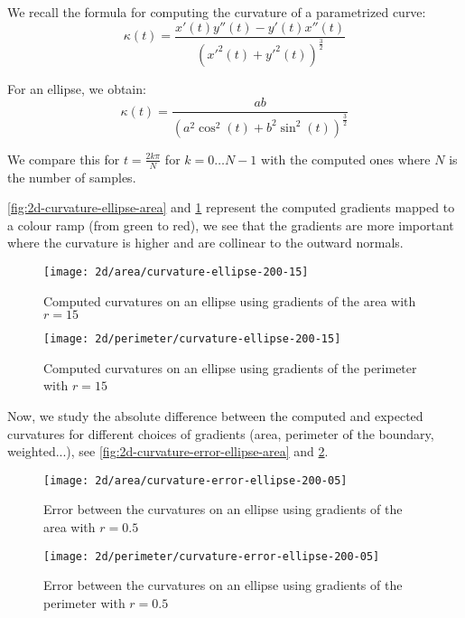 We recall the formula for computing the curvature of a parametrized curve:
$$ \kappa(t) = \frac{x'(t) y''(t) - y'(t) x''(t)}{(x'^2(t) +
    y'^2(t))^{\frac{3}{2}} } $$

For an ellipse, we obtain:
$$ \kappa(t) = \frac{ab}{(a^2 \cos^2(t) + b^2 \sin^2(t))^{\frac{3}{2}} } $$

We compare this for $ t = \frac{2 k \pi}{N} $ for $ k = 0 \ldots N - 1 $ with
the computed ones where $ N $ is the number of samples.

\ref{fig:2d-curvature-ellipse-area} and \ref{fig:2d-curvature-ellipse-perimeter}
represent the computed gradients mapped to a colour ramp (from green to red), we
see that the gradients are more important where the curvature is higher and are
collinear to the outward normals.

\begin{figure}[h]
    \centering

    \texttt{[image: 2d/area/curvature-ellipse-200-15]}
    \caption{Computed curvatures on an ellipse using gradients of the area with $ r = 15 $}
    \label{fig:2d-curvature-ellipse-area}

    \texttt{[image: 2d/perimeter/curvature-ellipse-200-15]}
    \caption{Computed curvatures on an ellipse using gradients of the perimeter with $ r = 15 $}
    \label{fig:2d-curvature-ellipse-perimeter}
\end{figure}


Now, we study the absolute difference between the computed and expected
curvatures for different choices of gradients (area, perimeter of the boundary,
weighted...), see \ref{fig:2d-curvature-error-ellipse-area} and
\ref{fig:2d-curvature-error-ellipse-perimeter}.

\begin{figure}[h]
    \centering

    \texttt{[image: 2d/area/curvature-error-ellipse-200-05]}
    \caption{Error between the curvatures on an ellipse using gradients of the area with $ r = 0.5 $}
    \label{fig:2d-curvature-error-ellipse-area}

    \texttt{[image: 2d/perimeter/curvature-error-ellipse-200-05]}
    \caption{Error between the curvatures on an ellipse using gradients of the perimeter with $ r = 0.5 $}
    \label{fig:2d-curvature-error-ellipse-perimeter}
\end{figure}

